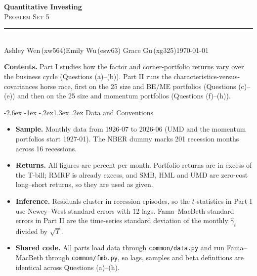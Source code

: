 \documentclass[11pt]{article}
\makeatletter
\renewcommand\section{\@startsection{section}{1}{0pt}%
  {-2.6ex \@plus -1ex \@minus -.2ex}{1.3ex \@plus .2ex}%
  {\normalfont\scshape\large\color{psink}}}   %
\newenvironment{tight}
  {\begin{itemize}\setlength{\itemsep}{3pt}\setlength{\parskip}{0pt}%
   \setlength{\topsep}{3pt}\setlength{\leftmargini}{1.4em}}
  {\end{itemize}}
\makeatother
\begin{document}
\thispagestyle{empty}
\begin{flushleft}
{\bfseries\LARGE\color{psink} Quantitative Investing}\\[3pt]
{\scshape\Large\color{psink} Problem Set 5}\\[10pt]
{\color{psrule}\rule{\textwidth}{1.2pt}}\\[5pt]
{\small Ashley Wen\,(xw564)\quad\textbar\quad Emily Wu\,(esw63)%
\quad\textbar\quad Grace Gu\,(xg325)\hfill \today}
\end{flushleft}

\vspace{1.4em}

{\color{psink}\textbf{Contents.}} Part I studies how the factor and corner-portfolio
returns vary over the business cycle (Questions (a)--(b)). Part II runs the
characteristics-versus-covariances horse race, first on the 25 size and BE/ME
portfolios (Questions (c)--(e)) and then on the 25 size and momentum portfolios
(Questions (f)--(h)).

\vspace{0.8em}

\section{Data and Conventions}

\begin{tight}
  \item \textbf{Sample.} Monthly data from 1926-07 to 2026-06 (UMD and the momentum
  portfolios start 1927-01). The NBER dummy marks 201 recession months across 16 recessions.
  \item \textbf{Returns.} All figures are percent per month. Portfolio returns are in
  excess of the T-bill; RMRF is already excess, and SMB, HML and UMD are zero-cost
  long--short returns, so they are used as given.
  \item \textbf{Inference.} Residuals cluster in recession episodes, so the $t$-statistics in
  Part I use Newey--West standard errors with 12 lags. Fama--MacBeth standard errors in
  Part II are the time-series standard deviation of the monthly $\hat\gamma_t$ divided
  by $\sqrt{T}$.
  \item \textbf{Shared code.} All parts load data through \texttt{common/data.py} and run
  Fama--MacBeth through \texttt{common/fmb.py}, so lags, samples and beta definitions
  are identical across Questions (a)--(h).
\end{tight}
\end{document}
